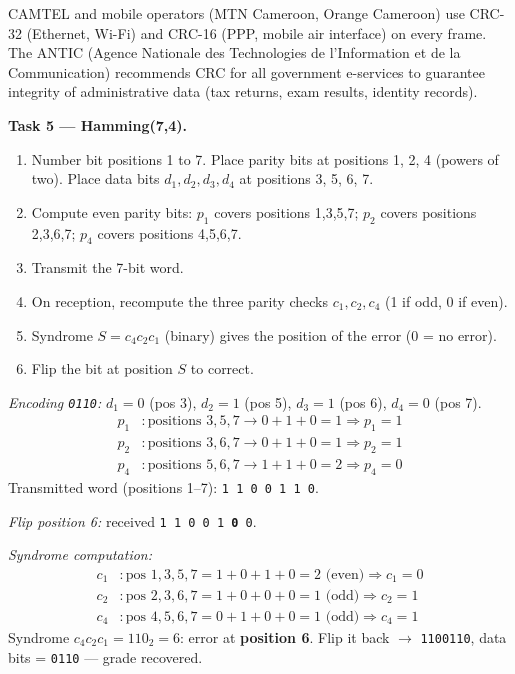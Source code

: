 \documentclass[11pt]{article}
\newcommand{\cle}[1]{{\popxbold\color{popdark}#1}}
\begin{document}
\begin{savaistu}
CAMTEL and mobile operators (MTN Cameroon, Orange Cameroon) use CRC-32 (Ethernet, Wi-Fi) and CRC-16 (PPP, mobile air interface) on every frame. The \cle{ANTIC} (Agence Nationale des Technologies de l'Information et de la Communication) recommends CRC for all government e-services to guarantee integrity of administrative data (tax returns, exam results, identity records).
\end{savaistu}

\textbf{Task 5 --- Hamming(7,4).}

\begin{methode}
\begin{enumerate}
\item Number bit positions 1 to 7. Place parity bits at positions 1, 2, 4 (powers of two). Place data bits $d_1,d_2,d_3,d_4$ at positions 3, 5, 6, 7.
\item Compute even parity bits:
  $p_1$ covers positions 1,3,5,7;
  $p_2$ covers positions 2,3,6,7;
  $p_4$ covers positions 4,5,6,7.
\item Transmit the 7-bit word.
\item On reception, recompute the three parity checks $c_1,c_2,c_4$ (1 if odd, 0 if even).
\item Syndrome $S = c_4c_2c_1$ (binary) gives the position of the error (0 = no error).
\item Flip the bit at position $S$ to correct.
\end{enumerate}
\end{methode}

\emph{Encoding \texttt{0110}:} $d_1=0$ (pos 3), $d_2=1$ (pos 5), $d_3=1$ (pos 6), $d_4=0$ (pos 7).
\begin{align*}
p_1 &: \text{positions } 3,5,7 \rightarrow 0+1+0 = 1 \Rightarrow p_1 = 1 \\
p_2 &: \text{positions } 3,6,7 \rightarrow 0+1+0 = 1 \Rightarrow p_2 = 1 \\
p_4 &: \text{positions } 5,6,7 \rightarrow 1+1+0 = 2 \Rightarrow p_4 = 0
\end{align*}
Transmitted word (positions 1--7): \texttt{1\,1\,0\,0\,1\,1\,0}.

\emph{Flip position 6:} received \texttt{1\,1\,0\,0\,1\,\textbf{0}\,0}.

\emph{Syndrome computation:}
\begin{align*}
c_1 &: \text{pos } 1,3,5,7 = 1+0+1+0 = 2 \text{ (even)} \Rightarrow c_1 = 0\\
c_2 &: \text{pos } 2,3,6,7 = 1+0+0+0 = 1 \text{ (odd)} \Rightarrow c_2 = 1\\
c_4 &: \text{pos } 4,5,6,7 = 0+1+0+0 = 1 \text{ (odd)} \Rightarrow c_4 = 1
\end{align*}
Syndrome $c_4c_2c_1 = 110_2 = 6$: error at \textbf{position 6}. Flip it back $\rightarrow$ \texttt{1100110}, data bits = \texttt{0110} --- grade recovered.
\end{document}
